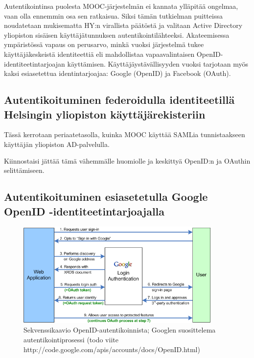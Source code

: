 \documentclass[finnish,gradu]{tktltiki}
\begin{document}
  Autentikointinsa puolesta MOOC-järjestelmän ei kannata ylläpitää ongelmaa, vaan olla ennemmin osa sen ratkaisua. Siksi tämän tutkielman puitteissa noudatetaan mukisematta HY:n virallista päätöstä ja valitaan Active Directory yliopiston sisäisen käyttäjätunnuksen autentikointilähteeksi. Akateemisessa ympäristössä vapaus on perusarvo, minkä vuoksi järjestelmä tukee käyttäjäkeskeistä identiteettiä eli mahdollistaa vapaavalintaisen OpenID-identiteetintarjoajan käyttämisen. Käyttäjäystävällisyyden vuoksi tarjotaan myös kaksi esiasetettua identintarjoajaa: Google (OpenID) ja Facebook (OAuth).



  \subsection{Autentikoituminen federoidulla identiteetillä Helsingin yliopiston käyttäjärekisteriin} %
  \label{sub:autentikoituminen_helsingin_yliopiston_käyttäjärekisteriin}
  Tässä kerrotaan periaatetasolla, kuinka MOOC käyttää SAMLia tunnistaakseen käyttäjän yliopiston AD-palvelulla.

  Kiinnostaisi jättää tämä vähemmälle huomiolle ja keskittyä OpenID:n ja OAuthin selittämiseen.


  \subsection{Autentikoituminen esiasetetulla Google OpenID -identiteetintarjoajalla} %
  \label{sub:autentikoituminen_esiasetetulla_openid_identiteetintarjoajalla}

  \begin{figure}
    \centering
    \includegraphics[width=0.9\textwidth]{images/google_openid_diagram.png}
    \caption{Sekvenssikaavio OpenID-autentikoinnista; Googlen suosittelema autentikointiprosessi (todo viite http://code.google.com/apis/accounts/docs/OpenID.html)}
    \label{fig:sekvenssikaavio_google_openid}
  \end{figure}
\end{document}
